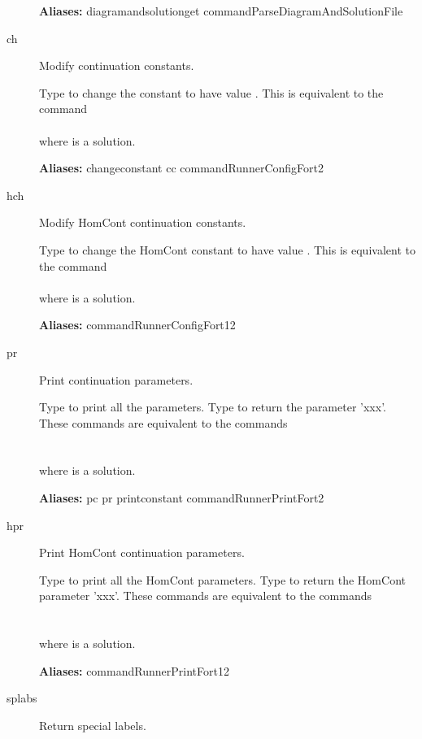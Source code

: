 \documentclass[12pt]{report}
\begin{document}
\begin{description}
\textbf{Aliases:} diagramandsolutionget commandParseDiagramAndSolutionFile

\item[ch]
Modify continuation constants.

    Type  to change the constant  to have
    value .
    This is equivalent to the command\\
    \\
    where  is a solution.

\textbf{Aliases:} changeconstant cc commandRunnerConfigFort2

\item[hch]
Modify HomCont continuation constants.

    Type  to change the HomCont constant  to have
    value .
    This is equivalent to the command\\
    \\
    where  is a solution.
    
\textbf{Aliases:} commandRunnerConfigFort12

\item[pr]
Print continuation parameters.

    Type  to print all the parameters.
    Type  to return the parameter 'xxx'.
    These commands are equivalent to the commands\\
    \\
    \\
    where  is a solution.
    
\textbf{Aliases:} pc pr printconstant commandRunnerPrintFort2

\item[hpr]
Print HomCont continuation parameters.

    Type  to print all the HomCont parameters.
    Type  to return the HomCont parameter 'xxx'.
    These commands are equivalent to the commands\\
    \\
    \\
    where  is a solution.
    
\textbf{Aliases:} commandRunnerPrintFort12

\item[splabs]
Return special labels.
        

\end{description}
\end{document}
